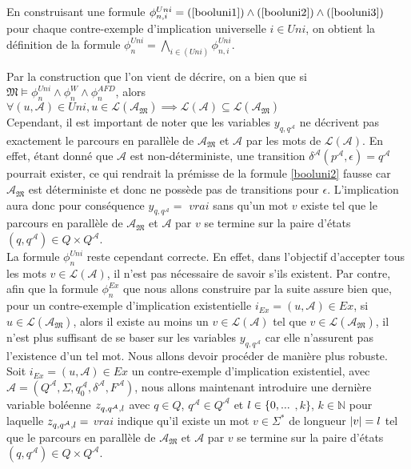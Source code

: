 \documentclass[12pt,a4paper,oneside,titlepage]{report}
\begin{document}
\noindent En construisant une formule $\phi_{n,i}^{Uni}=(\ref{booluni1})\land(\ref{booluni2})\land(\ref{booluni3})$ pour chaque contre-exemple d'implication universelle $i\in Uni$, on obtient la définition de la formule $\phi_n^{Uni}=\bigwedge_{i\in (Uni)}\phi^{Uni}_{n,i}$.

\noindent Par la construction que l'on vient de décrire, on a bien que si $\mathfrak{M}\models \phi_n^{Uni}\land\phi_n^W\land\phi_n^{AFD}$, alors $\forall (u,\mathcal{A})\in Uni, u\in\mathcal{L}(\mathcal{\mathcal{A}_\mathfrak{M}})\implies  \mathcal{L}(\mathcal{A})\subseteq \mathcal{L}(\mathcal{\mathcal{A}_\mathfrak{M}})$\\

\noindent Cependant, il est important de noter que les variables $y_{q,q^\mathcal{A}}$ ne décrivent pas exactement le parcours en parallèle de $\mathcal{A}_\mathfrak{M}$ et $\mathcal{A}$ par les mots de $\mathcal{L}(\mathcal{A})$. En effet, étant donné que $\mathcal{A}$ est non-déterministe, une transition $\delta^\mathcal{A}(p^\mathcal{A},\epsilon)=q^\mathcal{A}$ pourrait exister, ce qui rendrait la prémisse de la formule \ref{booluni2} fausse car $\mathcal{A}_\mathfrak{M}$ est déterministe et donc ne possède pas de transitions pour $\epsilon$. L'implication aura donc pour conséquence $y_{q,q^\mathcal{A}}=$ $vrai$ sans qu'un mot $v$ existe tel que le parcours en parallèle de $\mathcal{A}_\mathfrak{M}$ et $\mathcal{A}$ par $v$ se termine sur la paire d'états $(q,q^\mathcal{A})\in Q\times Q^\mathcal{A}$.\\
La formule $\phi_n^{Uni}$ reste cependant correcte. En effet, dans l'objectif d'accepter tous les mots $v\in\mathcal{L}(\mathcal{A})$, il n'est pas nécessaire de savoir s'ils existent. Par contre, afin que la formule $\phi_n^{Ex}$ que nous allons construire par la suite assure bien que, pour un contre-exemple d'implication existentielle $i_{Ex}=(u,\mathcal{A})\in Ex$, si $u\in\mathcal{L}(\mathcal{A}_\mathfrak{M})$, alors il existe au moins un $v\in\mathcal{L}(\mathcal{A})$ tel que $v\in\mathcal{L}(\mathcal{A}_\mathfrak{M})$, il n'est plus suffisant de se baser sur les variables $y_{q,q^\mathcal{A}}$ car elle n'assurent pas l'existence d'un tel mot. Nous allons devoir procéder de manière plus robuste.\\

\noindent Soit $i_{Ex}=(u,\mathcal{A})\in Ex$ un contre-exemple d'implication existentiel, avec $\mathcal{A}=(Q^\mathcal{A},\Sigma,q_0^\mathcal{A},\delta^\mathcal{A},F^\mathcal{A})$, nous allons maintenant introduire une dernière variable boléenne $z_{q,q^\mathcal{A},\mathnormal{l}}$ avec $q\in Q$, $q^\mathcal{A}\in Q^\mathcal{A}$ et $\mathnormal{l}\in \{0,...$ $,k\}$, $k\in\mathbb{N}$ pour laquelle $z_{q,q^\mathcal{A},\mathnormal{l}}=$ $vrai$ indique qu'il existe un mot $v\in\Sigma^*$ de longueur $|v|=\mathnormal{l}$ tel que le parcours en parallèle de $\mathcal{A}_\mathfrak{M}$ et $\mathcal{A}$ par $v$ se termine sur la paire d'états $(q,q^\mathcal{A})\in Q\times Q^\mathcal{A}$.\\
\end{document}
